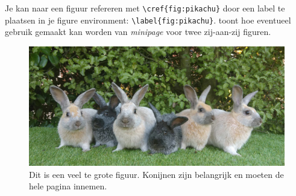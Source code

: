 Je kan naar een figuur refereren met \lstinline!\cref{fig:pikachu}! door een label te plaatsen in je figure environment: \lstinline!\label{fig:pikachu}!.
 toont hoe eventueel gebruik gemaakt kan worden van \textit{minipage} voor twee zij-aan-zij figuren.
\begin{figure}[!htpb]
    \centering
    \includegraphics[width=\textwidth]{Figures/Enderby_Island_Rabbit_Lineup.jpg}
    \caption{Dit is een veel te grote figuur. Konijnen zijn belangrijk en moeten de hele pagina innemen.}
    \label{fig:konijnen}
\end{figure}

